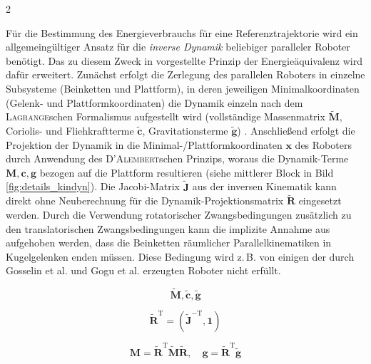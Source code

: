 \documentclass[fleqn,a4paper,10pt]{article}
\newcommand{\bm}[1]{\mathbf{#1}}
\newcommand{\transp}[0]{{\mathrm{T}}}
\begin{document}
\begin{multicols}{2}
\begin{figure*}
	\centering
	
	\label{fig:details_kindyn}
\end{figure*}


Für die Bestimmung des Energieverbrauchs für eine Referenztrajektorie wird ein allgemeingültiger Ansatz für die \emph{inverse Dynamik} beliebiger paralleler Roboter benötigt.
Das zu diesem Zweck in \cite{AbdellatifHei2009,DoThanhKotHeiOrt2009b} vorgestellte Prinzip der Energieäquivalenz wird dafür erweitert.
Zunächst erfolgt die Zerlegung des parallelen Roboters in einzelne Subsysteme (Beinketten und Plattform), in deren jeweiligen Minimalkoordinaten (Gelenk- und Plattformkoordinaten) die Dynamik einzeln nach dem \textsc{Lagrange}schen Formalismus aufgestellt wird (vollständige Massenmatrix $\tilde{\bm{M}}$, Coriolis- und Fliehkraftterme $\tilde{\bm{c}}$, Gravitationsterme $\tilde{\bm{g}}$) \cite{DoThanhKotHeiOrt2009b}.
Anschließend erfolgt die Projektion der Dynamik in die Minimal-/Plattformkoordinaten $\bm{x}$ des Roboters durch Anwendung des \textsc{D'Alembert}schen Prinzips, woraus die Dynamik-Terme $\bm{M},\bm{c},\bm{g}$ bezogen auf die Plattform resultieren \cite{DoThanhKotHeiOrt2009b,AbdellatifHei2009} (siehe mittlerer Block in Bild\,\ref{fig:details_kindyn}).
Die Jacobi-Matrix $\tilde{\bm{J}}$ aus der inversen Kinematik kann direkt ohne Neuberechnung für die Dynamik-Projektionsmatrix $\tilde{\bm{R}}$ eingesetzt werden.
Durch die Verwendung rotatorischer Zwangsbedingungen \cite{SchapplerTapOrt2019c} zusätzlich zu den translatorischen Zwangsbedingungen kann die implizite Annahme aus \cite{AbdellatifHei2009} aufgehoben werden, dass die Beinketten räumlicher Parallelkinematiken in Kugelgelenken enden müssen.
Diese Bedingung wird z.\,B. von einigen der durch Gosselin et al. \cite{KongGos2007} und Gogu et al. \cite{Gogu2008} erzeugten Roboter nicht erfüllt.


\begin{equation}
\tilde{\bm{M}}, \tilde{\bm{c}}, \tilde{\bm{g}}
\end{equation}

\begin{equation}
\tilde{\bm{R}}^\transp=\left(\tilde{\bm{J}}^{-\transp},\bm{1}\right)
\end{equation}

\begin{equation}
\bm{M}=\tilde{\bm{R}}^\transp\tilde{\bm{M}}\tilde{\bm{R}}, \quad \bm{g}=\tilde{\bm{R}}^\transp\tilde{\bm{g}}
\end{equation}



\end{multicols}
\end{document}

